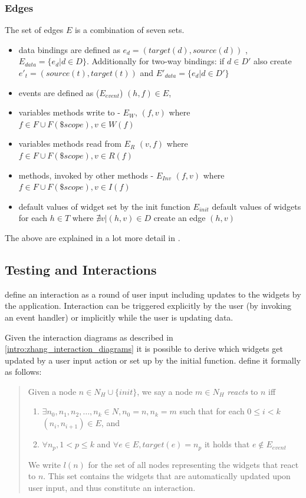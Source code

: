 \subsubsection{Edges}
The set of edges $E$ is a combination of seven sets.

\begin{itemize}
  \item data bindings are defined as $e_d = (target(d),source(d))$ , $E_{data} = \{e_d |  d \in D \}$. Additionally for two-way bindings: if $d \in D'$ also create $e'_t = (source(t),target(t))$ and $E'_{data} = \{e_d |  d \in D' \}$
\item events are defined as ($E_{event}$) $(h,f) \in E$,
\item variables methods write to - $E_{W}$, $(f,v)$ where $f \in F \cup F(\$scope), v \in W(f)$
\item variables methods read from $E_{R}$ $(v,f)$ where $f \in F \cup F(\$scope), v \in R(f)$
\item methods, invoked by other methods - $E_{Inv}$ $(f,v)$ where $f \in F \cup F(\$scope), v \in I(f)$
\item  default values of widget set by the init function
$E_{init}$ default values of widgets 
for each $h \in T $ where $ \nexists v | (h,v) \in D$ create an edge $(h,v)$ 
\end{itemize}
The above are explained in a lot more detail in \parencite[9]{zhang2019scenario}.

\subsection{Testing and Interactions}
\textcite{zhang2019scenario} define an interaction as a round of user input including updates to the widgets by the application. Interaction can be triggered explicitly by the user (by invoking an event handler) or implicitly while the user is updating data. \parencite{zhang2019scenario}

Given the interaction diagrams as described in \ref{intro:zhang_interaction_diagrams} it is possible to derive which widgets get updated by a user input action or set up by the initial function. \textcite{zhang2019scenario} define it formally as follows:
\begin{quote}
\label{quote:interactions}
Given a node $n \in N_H \cup \{init\}$, we say a node $m \in N_H$ \textit{reacts} to $n$ iff
  \begin{enumerate}
      \item $\exists n_0,n_1,n_2, \ldots,n_k \in N, n_0=n,n_k=m$ such that for each $0 \leq i < k  $ $(n_i,n_{i+1}) \in E$, and 
      \item $\forall n_p, 1 < p \leq k$ and $\forall e \in E, target(e)= n_p$ it holds that $e \notin E_{event}$  
  \end{enumerate}
  We write $l(n)$ for the set of all nodes representing the widgets that react to $n$. This set contains the widgets that are automatically updated upon user input,
  and thus constitute an interaction.
  \end{quote}

